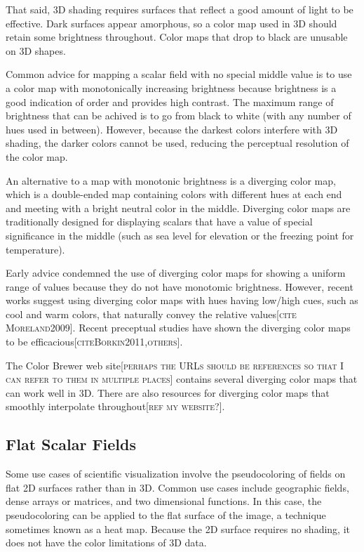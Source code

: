 \documentclass[letterpaper,twocolumn,fleqn]{article}
\newcommand{\fix}[1]{{\color{red}\textsc{[#1]}}}
\begin{document}
That said, 3D shading requires surfaces that reflect a good amount of light
to be effective. Dark surfaces appear amorphous, so a color map used in 3D
should retain some brightness throughout. Color maps that drop to black are
unusable on 3D shapes.

Common advice for mapping a scalar field with no special middle value is to
use a color map with monotonically increasing brightness because brightness
is a good indication of order and provides high contrast. The maximum range
of brightness that can be achived is to go from black to white (with any
number of hues used in between). However, because the darkest colors
interfere with 3D shading, the darker colors cannot be used, reducing the
perceptual resolution of the color map.

An alternative to a map with monotonic brightness is a diverging color map,
which is a double-ended map containing colors with different hues at each
end and meeting with a bright neutral color in the middle. Diverging color
maps are traditionally designed for displaying scalars that have a value of
special significance in the middle (such as sea level for elevation or the
freezing point for temperature).

Early advice condemned the use of diverging color maps for showing a
uniform range of values because they do not have monotomic brightness.
However, recent works suggest using diverging color maps with hues having
low/high cues, such as cool and warm colors, that naturally convey the
relative values\fix{cite Moreland2009}. Recent preceptual studies have
shown the diverging color maps to be
efficacious\fix{citeBorkin2011,others}.

The Color Brewer web site\fix{perhaps the URLs should be references so that
  I can refer to them in multiple places} contains several diverging color
maps that can work well in 3D. There are also resources for diverging color
maps that smoothly interpolate throughout\fix{ref my website?}.

\subsection{Flat Scalar Fields}

\noindent
Some use cases of scientific visualization involve the pseudocoloring of
fields on flat 2D surfaces rather than in 3D. Common use cases include
geographic fields, dense arrays or matrices, and two dimensional functions.
In this case, the pseudocoloring can be applied to the flat surface of the
image, a technique sometimes known as a heat map. Because the 2D surface
requires no shading, it does not have the color limitations of 3D data.
\end{document}
